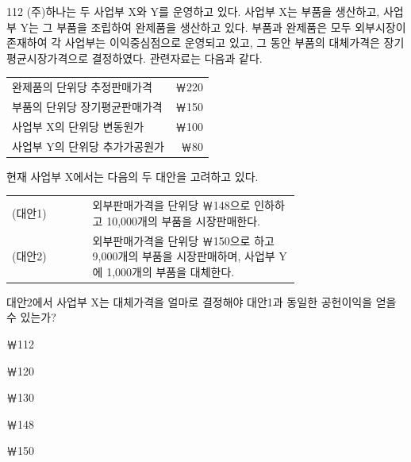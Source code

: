 \begin{question}{112}
(주)하나는 두 사업부 X와 Y를 운영하고 있다. 사업부 X는 부품을 생산하고, 사업부 Y는 그 부품을 조립하여 완제품을 생산하고 있다. 부품과 완제품은 모두 외부시장이 존재하여 각 사업부는 이익중심점으로 운영되고 있고, 그 동안 부품의 대체가격은 장기평균시장가격으로 결정하였다. 관련자료는 다음과 같다.

{\small\centering
\begin{tabular}{lr}
\hline
완제품의 단위당 추정판매가격 & ￦220 \\
부품의 단위당 장기평균판매가격 & ￦150 \\
사업부 X의 단위당 변동원가 & ￦100 \\
사업부 Y의 단위당 추가가공원가 & ￦80 \\
\hline
\end{tabular}
\par}

현재 사업부 X에서는 다음의 두 대안을 고려하고 있다. \par

{\small\centering
\begin{tabular}{lp{0.72\linewidth}}
\hline
(대안1) & 외부판매가격을 단위당 ￦148으로 인하하고 10,000개의 부품을 시장판매한다. \\
(대안2) & 외부판매가격을 단위당 ￦150으로 하고 9,000개의 부품을 시장판매하며, 사업부 Y에 1,000개의 부품을 대체한다. \\
\hline
\end{tabular}
\par}

대안2에서 사업부 X는 대체가격을 얼마로 결정해야 대안1과 동일한 공헌이익을 얻을 수 있는가? \par
\begin{choices}
  \item ￦112
  \item ￦120
  \item ￦130
  \item ￦148
  \item ￦150
\end{choices}
\end{question}
